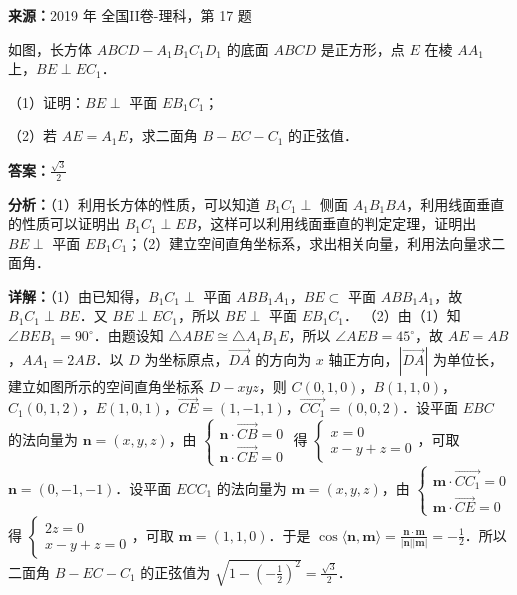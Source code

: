 \begin{question}[points=12]
\textbf{来源：}2019 年 全国II卷-理科，第 17 题\par
如图，长方体 $ABCD-A_1B_1C_1D_1$ 的底面 $ABCD$ 是正方形，点 $E$ 在棱 $AA_1$ 上，$BE\perp EC_1$．

（1）证明：$BE\perp$ 平面 $EB_1C_1$；

（2）若 $AE=A_1E$，求二面角 $B-EC-C_1$ 的正弦值．
\begin{solution}
\textbf{答案：}$\frac{\sqrt{3}}{2}$

\textbf{分析：}（1）利用长方体的性质，可以知道 $B_1C_1\perp$ 侧面 $A_1B_1BA$，利用线面垂直的性质可以证明出 $B_1C_1\perp EB$，这样可以利用线面垂直的判定定理，证明出 $BE\perp$ 平面 $EB_1C_1$；（2）建立空间直角坐标系，求出相关向量，利用法向量求二面角．

\textbf{详解：}（1）由已知得，$B_1C_1\perp$ 平面 $ABB_1A_1$，$BE\subset$ 平面 $ABB_1A_1$，故 $B_1C_1\perp BE$．又 $BE\perp EC_1$，所以 $BE\perp$ 平面 $EB_1C_1$．
（2）由（1）知 $\angle BEB_1=90^\circ$．由题设知 $\triangle ABE\cong\triangle A_1B_1E$，所以 $\angle AEB=45^\circ$，故 $AE=AB$，$AA_1=2AB$．以 $D$ 为坐标原点，$\overrightarrow{DA}$ 的方向为 $x$ 轴正方向，$|\overrightarrow{DA}|$ 为单位长，建立如图所示的空间直角坐标系 $D-xyz$，则 $C(0,1,0)$，$B(1,1,0)$，$C_1(0,1,2)$，$E(1,0,1)$，$\overrightarrow{CE}=(1,-1,1)$，$\overrightarrow{CC_1}=(0,0,2)$．设平面 $EBC$ 的法向量为 $\mathbf{n}=(x,y,z)$，由 $\begin{cases} \mathbf{n}\cdot\overrightarrow{CB}=0 \\ \mathbf{n}\cdot\overrightarrow{CE}=0 \end{cases}$ 得 $\begin{cases} x=0 \\ x-y+z=0 \end{cases}$，可取 $\mathbf{n}=(0,-1,-1)$．设平面 $ECC_1$ 的法向量为 $\mathbf{m}=(x,y,z)$，由 $\begin{cases} \mathbf{m}\cdot\overrightarrow{CC_1}=0 \\ \mathbf{m}\cdot\overrightarrow{CE}=0 \end{cases}$ 得 $\begin{cases} 2z=0 \\ x-y+z=0 \end{cases}$，可取 $\mathbf{m}=(1,1,0)$．于是 $\cos\langle\mathbf{n},\mathbf{m}\rangle=\frac{\mathbf{n}\cdot\mathbf{m}}{|\mathbf{n}||\mathbf{m}|}=-\frac{1}{2}$．所以二面角 $B-EC-C_1$ 的正弦值为 $\sqrt{1-(-\frac{1}{2})^2}=\frac{\sqrt{3}}{2}$．
\end{solution}
\end{question}

